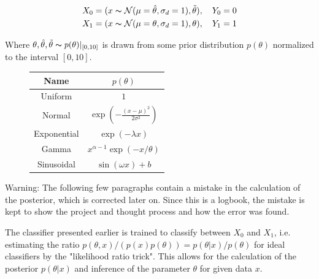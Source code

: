 \documentclass{article}
\begin{document}
\begin{align*}
X_0 = (x\thicksim \mathcal{N}(\mu=\hat\theta, \sigma_d=1), \tilde\theta), \quad Y_0 = 0 \\
X_1 = (x\thicksim \mathcal{N}(\mu=\theta, \sigma_d=1), \theta), \quad Y_1 = 1
\end{align*}

Where $\theta, \hat\theta, \tilde\theta\thicksim p(\theta)|_{[0, 10]}$ is drawn from some prior distribution $p(\theta)$ normalized to the interval $[0, 10]$.

\begin{figure}[ht]
    \centering
    \begin{minipage}[c]{0.48\textwidth}
        \centering
        
        \label{fig:example}
    \end{minipage}\hfill
    \begin{minipage}[c]{0.48\textwidth}
        \centering
        \begin{tabular}{|c|c|}
            \hline
            \textbf{Name} & $p(\theta)$ \\ \hline
            Uniform & $1$ \\ \hline
            Normal & $\exp\left(-\frac{(x-\mu)^2}{2\sigma^2}\right)$ \\ \hline
            Exponential & $\exp(-\lambda x)$ \\ \hline
            Gamma & $x^{\alpha-1} \exp\left(-x / \theta \right)$ \\ \hline
            Sinusoidal & $\sin\left(\omega x \right)+b$ \\ \hline
        \end{tabular}
        \label{tab:4x2}
    \end{minipage}
\end{figure}

Warning: The following few paragraphs contain a mistake in the calculation of the posterior, which is corrected later on.
Since this is a logbook, the mistake is kept to show the project and thought process and how the error was found.

The classifier presented earlier is trained to classify between $X_0$ and $X_1$,
i.e. estimating the ratio $p(\theta,x)/(p(x)p(\theta)) = p(\theta|x)/p(\theta)$ for ideal classifiers by the "likelihood ratio trick".
This allows for the calculation of the posterior $p(\theta|x)$ and inference of the parameter $\theta$ for given data $x$.
\end{document}
